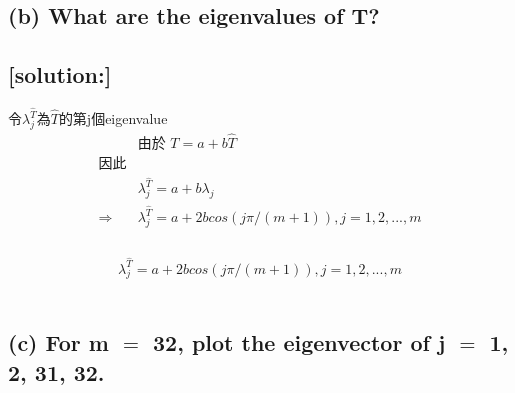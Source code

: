 \documentclass[12pt]{article}
\begin{document}
        \subsection*{(b) What are the eigenvalues of T?}
        \subsection*{[solution:]}
        令$\lambda^{\hat{T}}_{j}$為$\hat{T}$的第j個eigenvalue\\
        \[
            \begin{aligned}
                &\text{由於 $T = a+b\hat{T}$}\\
                \text{因此}&\\
                & \lambda^{\hat{T}}_{j} = a+b\lambda_{j}\\
    \Rightarrow & \lambda^{\hat{T}}_{j} = a+2bcos(j\pi/(m+1)), j=1,2,...,m\\
            \end{aligned}
        \]
        \\
                $$\lambda^{\hat{T}}_{j} = a+2bcos(j\pi/(m+1)), j=1,2,...,m$$\\
        \subsection*{(c) For m $=$ 32, plot the eigenvector of j $=$ 1, 2, 31, 32.}
\end{document}
